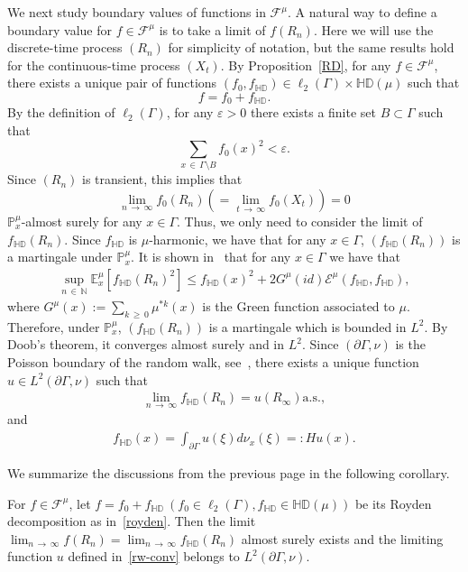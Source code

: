 \documentclass[10pt]{amsart}
\theoremstyle{definition}\newtheorem{defi}[theo]{Definition}\newtheorem{rema}[theo]{Remark}\newtheorem{exam}[theo]{Example}\newtheorem{exem}[theo]{Example}\newtheorem{nota}[theo]{Notation}
\newcommand{\ce}{\mathcal{E}}
\newcommand{\cf}{\mathcal{F}}
\newcommand{\bp}{\mathbb{P}}
\newcommand{\bn}{\mathbb{N}}
\newcommand{\be}{\mathbb{E}}
\newcommand{\bHD}{\mathbb{HD}}
\begin{document}
We next study boundary values of functions in $\cf^{\mu}$. A natural way to define a boundary value for $f\in\cf^{\mu}$ is to take a limit of $f(R_n)$. Here we will use the discrete-time process $(R_n)$ for simplicity of notation, but the same results hold for the continuous-time process $(X_t)$. By Proposition~\ref{RD}, for any $f\in\cf^{\mu}$, there exists a unique pair of functions $(f_0,f_{\bHD})\in\ell_2(\Gamma)\times
\bHD(\mu)$ such that
\[
f=f_0+f_{\bHD}.
\]
By the definition of $\ell_2(\Gamma)$, for any $\varepsilon>0$ there exists a finite set $B\subset \Gamma$ such that
\[
\sum_{x\,\in\,\Gamma\setminus B}f_0(x)^2<\varepsilon.
\]
Since $(R_n)$ is transient, this implies that
\[
\lim_{n\,\to\,\infty}f_0(R_n)\left(=\lim_{t\,\to\,\infty}f_0(X_t)\right)=0
\]
$\bp^{\mu}_x$-almost surely for any $x\in\Gamma$. Thus, we only need to consider the limit of $f_{\bHD}(R_n)$. Since $f_{\bHD}$ is $\mu$-harmonic, we have that for any $x\in\Gamma$, $(f_{\bHD}(R_n))$ is a martingale under $\bp^{\mu}_x$. It is shown in~\cite[Theorem~9.11]{LP} that for any $x\in\Gamma$ we have that
\begin{align*}
\sup_{n\,\in\,\bn}\be^{\mu}_x\left[f_{\bHD}(R_n)^2\right]\leq f_{\bHD}(x)^2+2G^{\mu}(id)
\ce^{\mu}(f_{\bHD},f_{\bHD}),
\end{align*}
where $G^{\mu}(x):=\sum_{k\,\geq\,0}\mu^{*k}(x)$ is the Green function associated to $\mu$. Therefore, under $\bp^{\mu}_x$, $(f_{\bHD}(R_n))$ is a martingale which is bounded in $L^2$. By Doob's theorem, it converges almost surely and in $L^2$. Since $(\partial\Gamma,\nu)$ is the Poisson boundary of the random walk, see~\cite{Ka}, there exists a unique function $u\in L^2(\partial\Gamma,\nu)$ such that
\begin{align}\label{rw-conv}
\lim_{n\,\to\,\infty}f_{\bHD}(R_n)=u(R_{\infty})\text{a.s.},
\end{align}
and
\begin{align}\label{he}
f_{\bHD}(x)=\int_{\partial\Gamma}u(\xi)d\nu_x(\xi)=:Hu(x).
\end{align}


We summarize the discussions from the previous page in the following corollary.
\begin{coro}\label{new}
For $f\in\cf^\mu$, let $f=f_0+f_{\bHD}\ (f_0\in\ell_2(\Gamma),f_{\bHD}\in\bHD(\mu))$ be its Royden decomposition as in~\eqref{royden}. Then the limit $\lim_{n\,\to\,\infty} f(R_n)=\lim_{n\,\to\,\infty} f_{\bHD}(R_n)$ almost surely exists and the limiting function $u$ defined in~\eqref{rw-conv} belongs to $L^2(\partial \Gamma,\nu)$.
\end{coro}
\end{document}
